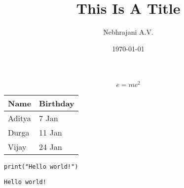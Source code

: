 \documentclass[11pt]{article}
\author{Nebhrajani A.V.}
\date{\today}
\title{This Is A Title}
\begin{document}
\maketitle
\tableofcontents

$$e = mc^2$$

\begin{center}
\begin{tabular}{ll}
\toprule
Name & Birthday\\
\midrule
Aditya & 7 Jan\\
Durga & 11 Jan\\
Vijay & 24 Jan\\
\bottomrule
\end{tabular}
\end{center}


\begin{verbatim}
print("Hello world!")
\end{verbatim}

\begin{verbatim}
Hello world!
\end{verbatim}
\end{document}
